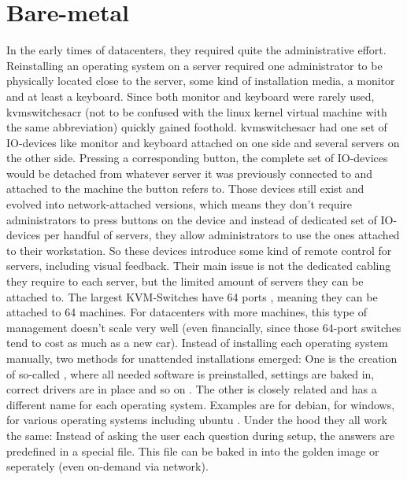 \section{Bare-metal}
In the early times of datacenters, they required quite the administrative effort. Reinstalling an operating system on a server required one administrator to be physically located close to the server, some kind of installation media, a monitor and at least a keyboard. Since both monitor and keyboard were rarely used, \gls{kvmswitchesacr} (not to be confused with the linux kernel virtual machine with the same abbreviation) quickly gained foothold. \Gls{kvmswitchesacr} had one set of IO-devices like monitor and keyboard attached on one side and several servers on the other side. Pressing a corresponding button, the complete set of IO-devices would be  detached from whatever server it was previously connected to and attached to the machine the button refers to.
\newline
Those devices still exist and evolved into network-attached versions, which means they don't require administrators to press buttons on the device and instead of dedicated set of IO-devices per handful of servers, they allow administrators to use the ones attached to their workstation. So these devices introduce some kind of remote control for servers, including visual feedback.
Their main issue is not the dedicated cabling they require to each server, but the limited amount of servers they can be attached to. The largest KVM-Switches have 64 ports \cite{64_port_kvm_switches}, meaning they can be attached to 64 machines. For datacenters with more machines, this type of management doesn't scale very well (even financially, since those 64-port switches tend to cost as much as a new car).
\newline
Instead of installing each operating system manually, two methods for unattended installations emerged: One is the creation of so-called , where all needed software is preinstalled, settings are baked in, correct drivers are in place and so on \cite{what_golden_image}. The other is closely related and has a different name for each operating system. Examples are  for debian,  for windows,  for various operating systems including ubuntu \cite{cloud_init_releases}. Under the hood they all work the same: Instead of asking the user each question during setup, the answers are predefined in a special file. This file can be baked in into the golden image or seperately (even on-demand via network).
